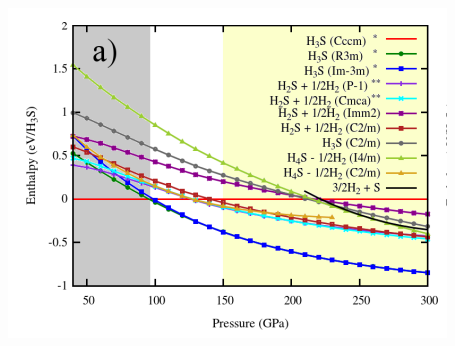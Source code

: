 \documentclass[amssymb,amsmath]{beamer}
\begin{document}
\begin{frame}
\begin{columns}
\begin{column}{0.5\textwidth}
\includegraphics[scale=0.4]{./figures/enthalpy_flores.png}
\end{column}\end{columns}
\end{frame}
\end{document}
